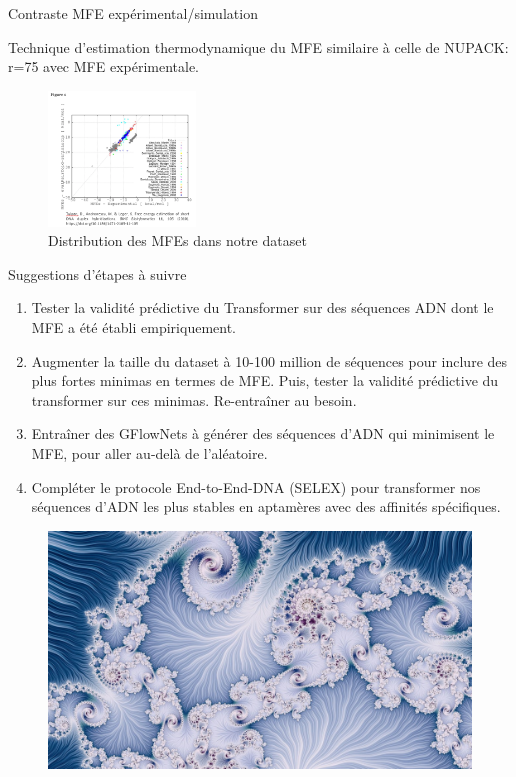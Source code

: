 \documentclass{beamer}
\begin{document}
\begin{frame}{Contraste MFE expérimental/simulation}

Technique d'estimation thermodynamique du MFE similaire à celle de NUPACK: r=75 avec MFE expérimentale.
\begin{figure} \label{fig:MFE_exp_simul}
    \caption{Distribution des MFEs dans notre dataset} \center
    \includegraphics[width=0.35\textwidth]{images/MFE_exp_simul.png}
\end{figure}

\end{frame}

\begin{frame}{Suggestions d'étapes à suivre}
\begin{enumerate}
    \item Tester la validité prédictive du Transformer sur des séquences ADN dont le MFE a été établi empiriquement.
    \item Augmenter la taille du dataset à 10-100 million de séquences pour inclure des plus fortes minimas en termes de MFE. Puis, tester la validité prédictive du transformer sur ces minimas. Re-entraîner au besoin.
    \item Entraîner des GFlowNets à générer des séquences d'ADN qui minimisent le MFE, pour aller au-delà de l'aléatoire.
    \item Compléter le protocole End-to-End-DNA (SELEX) pour transformer nos séquences d'ADN les plus stables en aptamères avec des affinités spécifiques.
\end{enumerate}

\end{frame}

\begin{frame}

\begin{figure} \label{fig:fractal}
    \center
    \includegraphics[width=1\textwidth]{images/Fractal.jpg}
\end{figure}

\end{frame}
\end{document}
